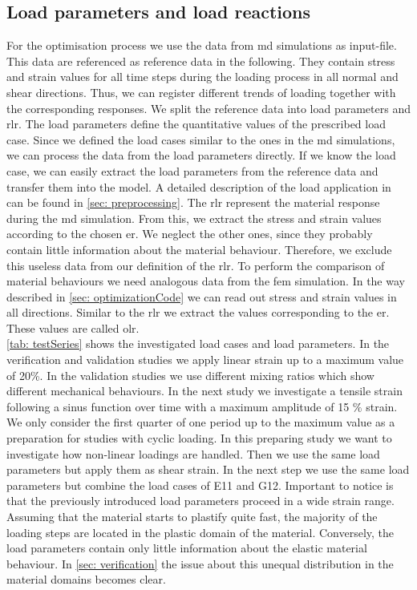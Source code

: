 \subsection{Load parameters and load reactions}\label{subsec:loadParameters}
For the optimisation process we use the data from \acrshort{md} simulations as input-file. This data are referenced as reference data in the following. They contain stress and strain values for all time steps during the loading process in all normal and shear directions. Thus, we can register different trends of loading together with the corresponding responses.
We split the reference data into load parameters and \acrfull{rlr}. The load parameters define the quantitative values of the prescribed load case. 
Since we defined the load cases similar to the ones in the \acrshort{md} simulations, we can process the data from the load parameters directly.  If we know the load case, we can easily extract the load parameters from the reference data and transfer them into the  model. A detailed description of the load application in  can be found in \autoref{sec: preprocessing}. 
The \acrshort{rlr} represent the material response during the \acrshort{md} simulation. From this, we extract the stress and strain values according to the chosen \acrlong{er}.  We neglect the other ones, since they probably contain little information about the material behaviour. Therefore, we exclude this useless data from our definition of the \acrshort{rlr}.
To perform the comparison of material behaviours we need analogous data from the \acrshort{fem} simulation. In the way described in \autoref{sec: optimizationCode} we can read out stress and strain values in all directions. Similar to the \acrshort{rlr} we extract the values corresponding to the \acrlong{er}. These values are called \acrfull{olr}. \\
\autoref{tab: testSeries} shows the investigated load cases and load parameters.
In the verification and validation studies we apply linear strain up to a maximum value of 20\%. In the validation studies we use different mixing ratios which show different mechanical behaviours. In the next study we investigate a tensile strain following a sinus function over time with a maximum amplitude of 15 \(\%\) strain. We only consider the first quarter of one period up to the maximum value as a preparation for studies with cyclic loading. In this preparing study we want to investigate how non-linear loadings are handled. Then we use the same load parameters but apply them as shear strain. In the next step we use the same load parameters but combine the load cases of E11 and G12. Important to notice is that the previously introduced load parameters proceed in a wide strain range. Assuming that the material starts to plastify quite fast, the majority of the loading steps are located in the plastic domain of the material. Conversely, the load parameters contain only little information about the elastic material behaviour. In \autoref{sec: verification} the issue about this unequal distribution in the material domains becomes clear.    
